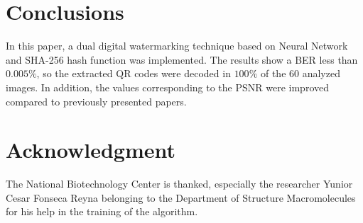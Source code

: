 \documentclass[runningheads]{llncs}
\begin{document}
\section{Conclusions}
In this paper, a dual digital watermarking technique based on Neural Network and SHA-256 hash function was implemented. The results show a BER less than $0.005 \%$, so the extracted QR codes were decoded in $100\%$ of the $60$ analyzed images. In addition, the values corresponding to the PSNR were improved compared to previously presented papers.

\section{Acknowledgment}
The National Biotechnology Center is thanked, especially the researcher Yunior Cesar Fonseca Reyna belonging to the Department of Structure Macromolecules for his help in the training of the algorithm.
%
%
%


%
\end{document}
